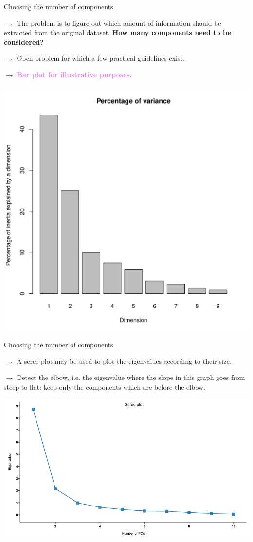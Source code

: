 \documentclass[9pt]{beamer}
\begin{document}
\begin{frame}{Choosing the number of components}

$\rightharpoondown$ The problem is to figure out \textcolor{lighto}{which amount of information} should be extracted from the original dataset. \textcolor{lighto}{{\bf How many components need to be considered?}}

$\rightharpoondown$ Open problem for which a \textcolor{lighto}{few practical guidelines exist}.

$\rightharpoondown$  \textcolor{violet}{{\bf Bar plot for illustrative purposes}}.

\begin{center}
\includegraphics[width=.5\textwidth]{./wine_pca_eig.pdf}
\end{center}

\end{frame}


\begin{frame}{Choosing the number of components}

$\rightharpoondown$ A \textcolor{lighto}{scree plot} may be used to  plot the eigenvalues according to their size.

$\rightharpoondown$ \textcolor{lighto}{Detect the elbow}, i.e. the eigenvalue where the \textcolor{lighto}{slope in this graph goes from
steep to flat}:  keep only the components which are before the elbow.  

\begin{center}
\includegraphics[width=.75\textwidth]{./screeplot}
\end{center}

\end{frame}
\end{document}
